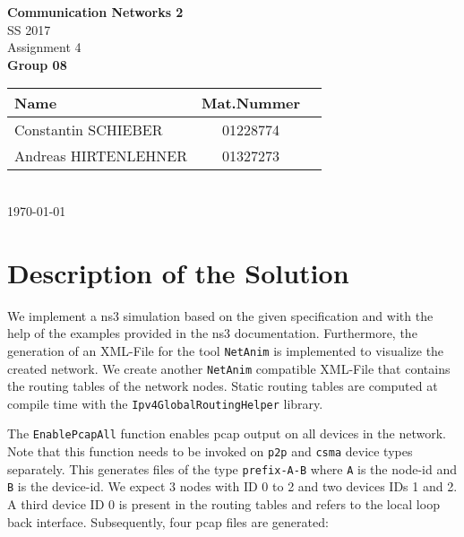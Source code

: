 \documentclass[parskip=full]{scrartcl}
\begin{document}
\begin{titlepage}
    \centering
    \vspace*{2cm}
    {\Huge \textbf{Communication Networks 2}}\\
    SS 2017\\
    \vspace*{1cm}
    {\Large Assignment 4}
    \\\vspace*{3cm}
    {\Large \textbf{Group 08}}\\
    \vspace*{1cm}
    {\large 
        \begin{tabular}{l c c}
            Name & Mat.Nummer \\ \hline
            Constantin SCHIEBER & 01228774 \\
            Andreas HIRTENLEHNER & 01327273
        \end{tabular}
    }
    \\\vspace*{7cm}
    \today
\end{titlepage}


\section{Description of the Solution}

We implement a ns3 simulation based on the given specification and with the help of the examples provided in the ns3 documentation.
Furthermore, the generation of an XML-File for the tool \texttt{NetAnim} is implemented to visualize the created network.
We create another \texttt{NetAnim} compatible XML-File that contains the routing tables of the network nodes.
Static routing tables are computed at compile time with the \texttt{Ipv4GlobalRoutingHelper} library.

The \texttt{EnablePcapAll} function enables pcap output on all devices in the network. 
Note that this function needs to be invoked on \texttt{p2p} and \texttt{csma} device types separately.
This generates files of the type \texttt{prefix-A-B} where \texttt{A} is the node-id and \texttt{B} is the device-id. 
We expect 3 nodes with ID 0 to 2 and two devices IDs 1 and 2. 
A third device ID 0 is present in the routing tables and refers to the local loop back interface. 
Subsequently, four pcap files are generated:
\end{document}
